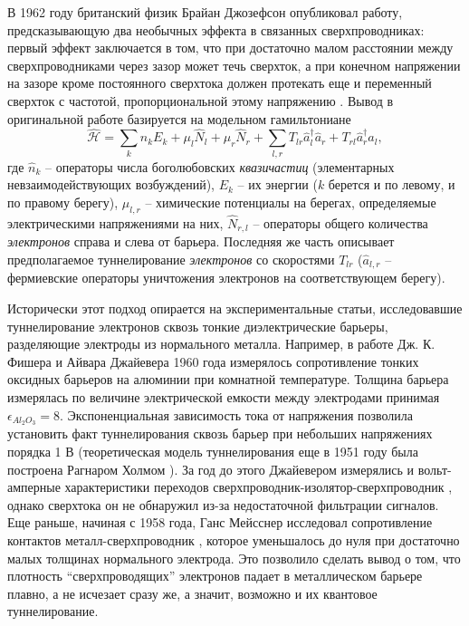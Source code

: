 \documentclass[14pt, a4paper]{extreport}
\numberwithin{equation}{section}
\begin{document}
В 1962 году британский физик Брайан Джозефсон опубликовал работу, предсказывающую два необычных эффекта в связанных сверхпроводниках: первый эффект заключается в том, что при достаточно малом расстоянии между сверхпроводниками через зазор может течь сверхток, а при конечном напряжении на зазоре кроме постоянного сверхтока должен протекать еще и переменный сверхток с частотой, пропорциональной этому напряжению \cite{josephson1962possible}. Вывод в оригинальной работе базируется на модельном гамильтониане
\begin{equation}
	\hat{\mathcal{H}} = \sum_k \hat n_k E_k + \mu_l \hat N_l + \mu_r \hat N_r + \sum_{l,r} T_{lr}\hat a^\dag_l \hat a_r + T_{rl} \hat a^\dag_r \hat a_l, \label{eq:josephson_tunnel}
\end{equation}
где $\hat n_k$ -- операторы числа боголюбовских \textit{квазичастиц} (элементарных невзаимодействующих возбуждений), $E_k$ -- их энергии ($k$ берется и по левому, и по правому берегу), $\mu_{l,r}$ -- химические потенциалы на берегах, определяемые электрическими напряжениями на них, $\hat N_{r,l}$ -- операторы общего количества \textit{электронов} справа и слева от барьера. Последняя же часть описывает предполагаемое туннелирование \textit{электронов} со скоростями $T_{lr}$ ($\hat a_{l,r}$ -- фермиевские операторы уничтожения электронов на соответствующем берегу). 

Исторически этот подход опирается на экспериментальные статьи, исследовавшие туннелирование электронов сквозь тонкие диэлектрические барьеры, разделяющие электроды из нормального металла. Например, в работе Дж. К. Фишера и Айвара Джайевера 1960 года  \cite{fisher1961tunneling} измерялось сопротивление тонких оксидных барьеров на алюминии при комнатной температуре. Толщина барьера измерялась по величине электрической емкости между электродами принимая $\epsilon_{Al_2O_3} = 8$. Экспоненциальная зависимость тока от напряжения позволила установить факт туннелирования сквозь барьер при небольших напряжениях порядка 1 В (теоретическая модель туннелирования еще в 1951 году была построена Рагнаром Холмом \cite{holm1951electric}). За год до этого Джайевером измерялись и вольт-амперные характеристики переходов сверхпроводник-изолятор-сверхпроводник \cite{giaever1960energy, giaever1960electron}, однако сверхтока он не обнаружил из-за недостаточной фильтрации сигналов. Еще раньше, начиная с 1958 года, Ганс Мейсснер исследовал сопротивление контактов металл-сверхпроводник \cite{meissner1958measurements, meissner1960superconductivity}, которое уменьшалось до нуля при достаточно малых толщинах нормального электрода. Это позволило сделать вывод о том, что плотность ``сверхпроводящих'' электронов падает в металлическом барьере плавно, а не исчезает сразу же, а значит, возможно и их квантовое туннелирование.
\end{document}
